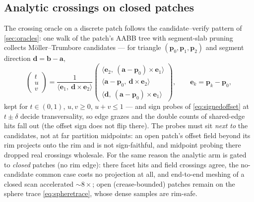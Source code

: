 \documentclass[11pt,a4paper]{article}
\numberwithin{equation}{section}
\newcommand{\vv}[1]{\mathbf{#1}}
\begin{document}
\subsection{Analytic crossings on closed patches}
The crossing oracle on a discrete patch follows the candidate--verify pattern
of \cref{sec:oracles}: one walk of the patch's AABB tree with segment-slab
pruning collects M\"oller--Trumbore \cite{MollerTrumbore1997} candidates ---
for triangle $(\vv p_0,\vv p_1,\vv p_2)$ and segment direction
$\vv d=\vv b-\vv a$,
\begin{equation}
\begin{pmatrix} t\\ u\\ v \end{pmatrix}
=\frac{1}{\langle \vv e_1,\ \vv d\times\vv e_2\rangle}
\begin{pmatrix}
\langle \vv e_2,\ (\vv a-\vv p_0)\times\vv e_1\rangle\\
\langle \vv a-\vv p_0,\ \vv d\times\vv e_2\rangle\\
\langle \vv d,\ (\vv a-\vv p_0)\times\vv e_1\rangle
\end{pmatrix},
\qquad \vv e_k=\vv p_k-\vv p_0,
\label{eq:mollertrumbore}
\end{equation}
kept for $t\in(0,1)$, $u,v\ge0$, $u+v\le1$ --- and sign probes of
\eqref{eq:signedoffset} at $t\pm\delta$ decide transversality, so edge grazes
and the double counts of shared-edge hits fall out (the offset sign does not
flip there). The probes must sit \emph{next to} the candidates, not at far
partition midpoints: an open patch's offset field beyond its rim projects onto
the rim and is not sign-faithful, and midpoint probing there dropped real
crossings wholesale. For the same reason the analytic arm is gated to
\emph{closed} patches (no rim edge): there facet hits and field crossings
agree, the no-candidate common case costs no projection at all, and
end-to-end meshing of a closed scan accelerated $\sim8\times$; open
(crease-bounded) patches remain on the sphere trace
\eqref{eq:spheretrace}, whose dense samples are rim-safe.
\end{document}
